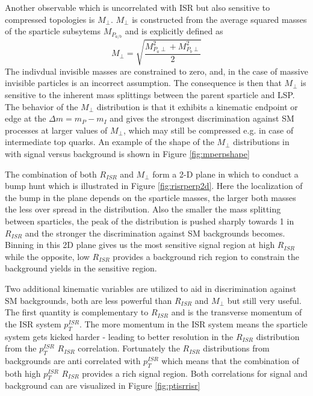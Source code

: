 Another observable which is uncorrelated with ISR but also sensitive to compressed topologies is $M_\perp$. $M_\perp$ is constructed from the average squared masses of the sparticle subsytems $M_{P_{a/b}}$ and is explicitly defined as
\begin{equation}
M_\perp = \sqrt{\frac{M_{P_a\perp}^2 + M_{P_b\perp}^2}{2}}
\end{equation}
The indivdual invisible masses are constrained to zero, and, in the case of massive invisible particles is an incorrect assumption. The consequence is then that $M_\perp$ is sensitive to the inherent mass splittings between the parent sparticle and LSP. The behavior of the $M_\perp$ distribution is that it exhibits a kinematic endpoint or edge at the $\Delta m = m_P - m_I$ and gives the strongest discrimination against SM processes at larger values of $M_\perp$, which may still be compressed e.g. in case of intermediate top quarks. An example of the shape of the $M_\perp$ distributions in with signal versus background is shown in Figure \ref{fig:mperpshape}


The combination of both $R_{ISR}$ and $M_\perp$ form a 2-D plane in which to conduct a bump hunt which is illustrated in Figure \ref{fig:risrperp2d}. Here the localization of the bump in the plane depends on the sparticle masses, the larger both masses the less over spread in the distribution. Also the smaller the mass splitting between sparticles, the peak of the distribution is pushed sharply towards 1 in $R_{ISR}$ and the stronger the discrimination against SM backgrounds becomes. Binning in this 2D plane gives us the most sensitive signal region at high $R_{ISR}$  while the opposite, low $R_{ISR}$ provides a background rich region to constrain the background yields in the sensitive region. 



Two additional kinematic variables are utilized to aid in discrimination against SM backgrounds, both are less powerful than $R_{ISR}$ and $M_\perp$ but still very useful. The first quantity is complementary to $R_{ISR}$ and is the transverse momentum of the ISR system $p_T^{ISR}$. The more momentum in the ISR system means the sparticle system gets kicked harder - leading to better resolution in the $R_{ISR}$ distribution from the $p_T^{ISR}$ $R_{ISR}$ correlation. Fortunately the $R_{ISR}$  distributions from backgrounds are anti correlated with $p_T^{ISR}$ which means that the combination of both high  $p_T^{ISR}$ $R_{ISR}$ provides a rich signal region. Both correlations for signal and background can are visualized in Figure \ref{fig:ptisrrisr}

